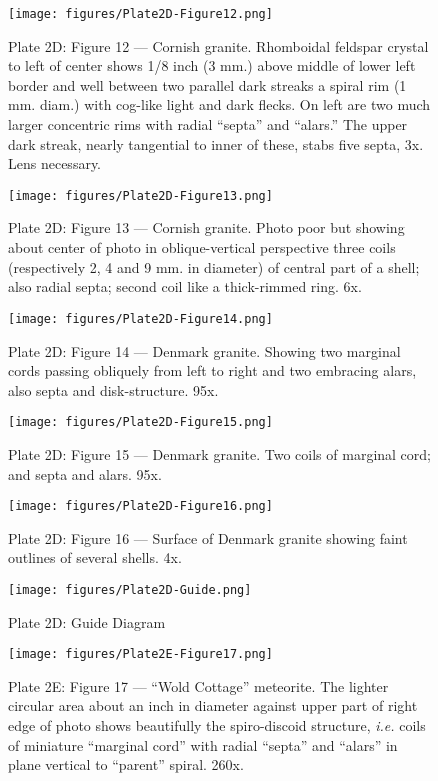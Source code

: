 \documentclass[a4paper, 12pt, oneside]{article}
\begin{document}
\clearpage
\begin{figure}[b]
\centering
\texttt{[image: figures/Plate2D-Figure12.png]}
\caption{\small Plate 2D: Figure 12 --- Cornish granite. Rhomboidal feldspar crystal to left of center shows 1/8 inch (3 mm.) above middle of lower left border and well between two parallel dark streaks a spiral rim (1 mm. diam.) with cog-like light and dark flecks. On left are two much larger concentric rims with radial ``septa'' and ``alars.'' The upper dark streak, nearly tangential to inner of these, stabs five septa, 3x. Lens necessary.}
\end{figure}
\clearpage
\begin{figure}[b]
\centering
\texttt{[image: figures/Plate2D-Figure13.png]}
\caption{\small Plate 2D: Figure 13 --- Cornish granite. Photo poor but showing about center of photo in oblique-vertical perspective three coils (respectively 2, 4 and 9 mm. in diameter) of central part of a shell; also radial septa; second coil like a thick-rimmed ring. 6x.}
\end{figure}
\clearpage
\begin{figure}[b]
\centering
\texttt{[image: figures/Plate2D-Figure14.png]}
\caption{\small Plate 2D: Figure 14 --- Denmark granite. Showing two marginal cords passing obliquely from left to right and two embracing alars, also septa and disk-structure. 95x.}
\end{figure}
\clearpage
\begin{figure}[b]
\centering
\texttt{[image: figures/Plate2D-Figure15.png]}
\caption{\small Plate 2D: Figure 15 --- Denmark granite. Two coils of marginal cord; and septa and alars. 95x.}
\end{figure}
\clearpage
\begin{figure}[b]
\centering
\texttt{[image: figures/Plate2D-Figure16.png]}
\caption{\small Plate 2D: Figure 16 --- Surface of Denmark granite showing faint outlines of several shells. 4x.}
\end{figure}
\clearpage
\begin{figure}[b]
\centering
\texttt{[image: figures/Plate2D-Guide.png]}
\caption{\small Plate 2D: Guide Diagram}
\end{figure}
\clearpage
{}
\cfoot{\thepage}
\begin{figure}[b]
\centering
\texttt{[image: figures/Plate2E-Figure17.png]}
\caption{\small Plate 2E: Figure 17 --- ``Wold Cottage'' meteorite. The lighter circular area about an inch in diameter against upper part of right edge of photo shows beautifully the spiro-discoid structure, \emph{i.e.} coils of miniature ``marginal cord'' with radial ``septa'' and ``alars'' in plane vertical to ``parent'' spiral. 260x.}
\end{figure}
\end{document}

